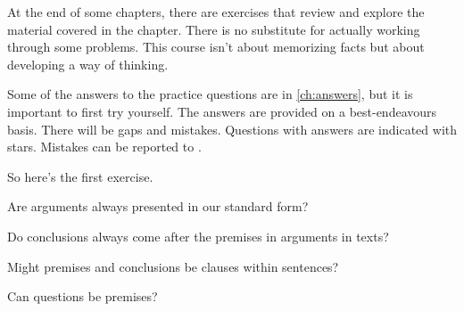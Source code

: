 \begin{practiceproblems}

At the end of some chapters, there are exercises that review and
explore the material covered in the chapter.
There is no substitute for actually working through some problems. This course isn't about memorizing facts but about developing a way of thinking.

Some of the answers to the practice questions are in \cref{ch:answers}, but it is important to first try yourself. The answers are provided on a best-endeavours basis. There will be gaps and mistakes. Questions with answers are indicated with stars. Mistakes can be reported to \MaintainerEmailLink.

So here’s the first exercise.
\problempart

\begin{problemslist}
\item Are arguments always presented in our standard form?
\item Do conclusions always come after the premises in arguments in texts?
\item Might premises and conclusions be clauses within sentences?
\item Can questions be premises?
\end{problemslist}


\end{practiceproblems}
